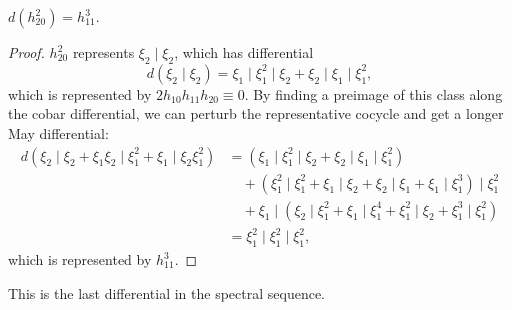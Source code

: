 \begin{lemma}
$d(h_{20}^2) = h_{11}^3$.
\end{lemma}
\begin{proof}
$h_{20}^2$ represents $\xi_2 \mid \xi_2$, which has differential \[d(\xi_2 \mid \xi_2) = \xi_1 \mid \xi_1^2 \mid \xi_2 + \xi_2 \mid \xi_1 \mid \xi_1^2,\] which is represented by $2 h_{10} h_{11} h_{20} \equiv 0$.  By finding a preimage of this class along the cobar differential, we can perturb the representative cocycle and get a longer May differential:
\begin{align*}
d(\xi_2 \mid \xi_2 + \xi_1 \xi_2 \mid \xi_1^2 + \xi_1 \mid \xi_2 \xi_1^2)
&       = (\xi_1 \mid \xi_1^2 \mid \xi_2 + \xi_2 \mid \xi_1 \mid \xi_1^2) \\
& \quad + (\xi_1^2 \mid \xi_1^2 + \xi_1 \mid \xi_2 + \xi_2 \mid \xi_1 + \xi_1 \mid \xi_1^3) \mid \xi_1^2 \\
& \quad + \xi_1 \mid (\xi_2 \mid \xi_1^2 + \xi_1 \mid \xi_1^4 + \xi_1^2 \mid \xi_2 + \xi_1^3 \mid \xi_1^2) \\
& = \xi_1^2 \mid \xi_1^2 \mid \xi_1^2,
\end{align*}
which is represented by $h_{11}^3$.
\end{proof}

This is the last differential in the spectral sequence.

\begin{remark}
\end{remark}








